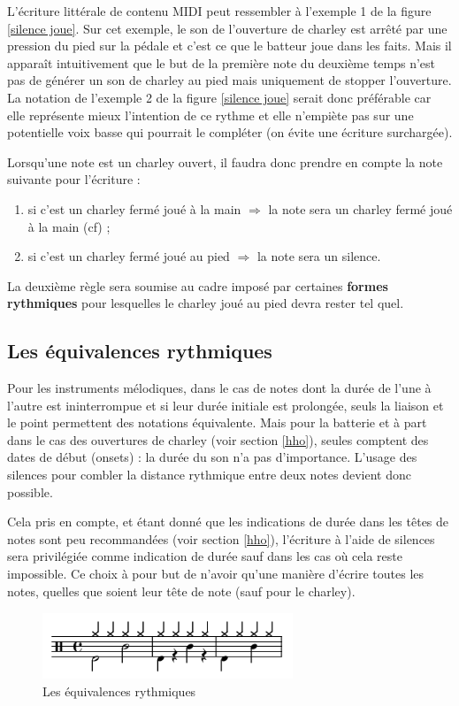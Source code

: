 L’écriture littérale de contenu MIDI peut ressembler à l’exemple 1 de la figure
\ref{silence joue}. Sur cet exemple, le son de l’ouverture de charley est
arrêté par une pression du pied sur la pédale et c’est ce que le batteur joue
dans les faits. Mais il apparaît intuitivement que le but de la première note
du deuxième temps n’est pas de générer un son de charley au pied mais
uniquement de stopper l’ouverture. La notation de l’exemple 2 de la figure
\ref{silence joue} serait donc préférable car elle représente mieux l’intention
de ce rythme et elle n’empiète pas sur une potentielle voix basse qui pourrait
le compléter (on évite une écriture surchargée).

Lorsqu’une note est un charley ouvert, il faudra donc prendre en compte la note
suivante pour l’écriture :
\begin{enumerate}
    \item si c’est un charley fermé joué à la main $\Rightarrow$ la note sera
        un charley fermé joué à la main (cf) ;
    \item si c’est un charley fermé joué au pied $\Rightarrow$ la note sera un
        silence.
\end{enumerate}
La deuxième règle sera soumise au cadre imposé par certaines
\textbf{formes rythmiques} pour lesquelles le charley joué au pied devra rester
tel quel. 

\subsection*{Les équivalences rythmiques}
Pour les instruments mélodiques, dans le cas de notes dont la durée de l’une à
l’autre est ininterrompue et si leur durée initiale est prolongée, seuls la
liaison et le point permettent des notations équivalente. Mais pour la
batterie et à part dans le cas des ouvertures de charley (voir section
\ref{hho}), seules comptent des dates de début (onsets) : la durée du son n’a
pas d’importance. L’usage des silences pour combler la distance rythmique entre
deux notes devient donc possible.

Cela pris en compte, et étant donné que les indications de durée dans les têtes
de notes sont peu recommandées (voir section \ref{hho}), l’écriture à l’aide de
silences sera privilégiée comme indication de durée sauf dans les cas où cela
reste impossible. Ce choix à pour but de n’avoir qu’une manière d’écrire toutes
les notes, quelles que soient leur tête de note (sauf pour le charley).

\begin{figure}[h]
	\centering
	\includegraphics[height=20mm, width=75mm]{
    z_images/3_methodes/0_notation_de_la_batterie/6_equivalence.png}
	\caption{Les équivalences rythmiques}
	\label{equivalence}
\end{figure}

